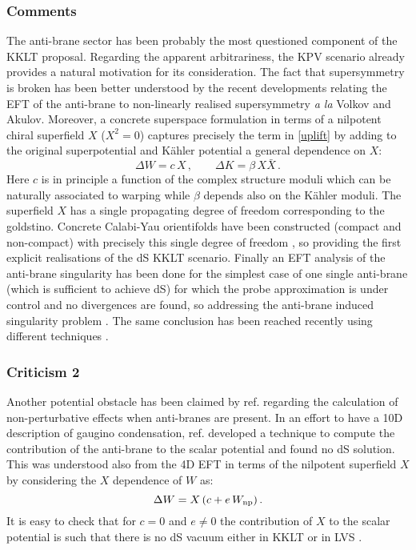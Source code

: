 \documentclass[11pt,a4paper]{article}
\newcommand{\be}{\begin{equation}}
\newcommand{\ee}{\end{equation}}
\begin{document}
 
\subsubsection*{Comments}

The anti-brane sector has been probably the most questioned component of the KKLT proposal. Regarding the apparent arbitrariness, the KPV scenario already provides a natural motivation for its consideration. The fact that supersymmetry is broken has been better understood by the recent developments relating the EFT of the anti-brane to non-linearly realised supersymmetry {\it a la}  Volkov and Akulov. Moreover, a concrete superspace formulation in terms of a nilpotent chiral superfield $X$ ($X^2=0$) \cite{Ferrara:2014kva, Bergshoeff:2015jxa} captures precisely the term in \eqref{uplift} by adding to the original superpotential and K\"ahler potential  a general dependence on $X$:
\be
\Delta W= c \,X\,,  \qquad \Delta K = \beta\, X\bar{X}\,.
\ee
Here $c$ is in principle a function of the complex structure moduli which can be naturally associated to warping while $\beta$ depends also on the K\"ahler  moduli. The superfield $X$ has a single propagating degree of freedom corresponding to the goldstino. Concrete Calabi-Yau orientifolds have been constructed (compact and non-compact) with precisely this single degree of freedom \cite{Kallosh:2015nia, Garcia-Etxebarria:2015lif}, so providing the first explicit realisations of the dS KKLT scenario. Finally an EFT analysis of the anti-brane singularity has been done for the simplest case of one single anti-brane (which is sufficient to achieve dS) for which the probe approximation is under control and no divergences are found, so addressing the anti-brane induced singularity problem \cite{Michel:2014lva, Polchinski:2015bea}. The same conclusion has been reached recently using different techniques \cite{Cohen-Maldonado:2015ssa, Cohen-Maldonado:2015lyb, Danielsson:2018ztv}.
 

\subsubsection*{Criticism 2}

Another potential obstacle has been claimed by ref. \cite{Moritz:2017xto} regarding the calculation of non-perturbative effects when anti-branes are present. In an effort to have a 10D description of gaugino condensation, ref. \cite{Moritz:2017xto} developed a technique to compute the contribution of the anti-brane to the scalar potential and found no dS solution. This was understood also from the 4D EFT in terms of the nilpotent superfield $X$ by considering the $X$ dependence of $W$ as:
\be
\Delta W= X\left(c+e \,W_{\rm np}\right).
\ee
It is easy to check that for $c=0$ and $e\neq 0$ the contribution of $X$ to the scalar potential is such that there is no dS vacuum either in KKLT \cite{Moritz:2017xto} or in LVS \cite{MQRW}.
\end{document}
